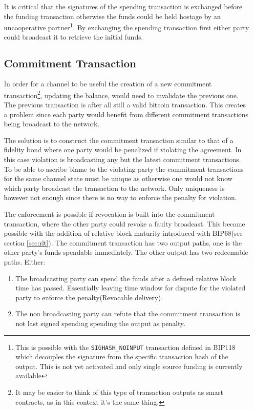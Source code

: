 It is critical that the signatures of the spending transaction is exchanged before the funding transaction otherwise the funds could be held hostage by an uncooperative partner\footnote{This is possible with the \texttt{SIGHASH\_NOINPUT} transaction defined in BIP118\cite{bip:0118:sighash:noinput} which decouples the signature from the specific transaction hash of the output. This is not yet activated and only single source funding is currently available}. By exchanging the spending transaction first either party could broadcast it to retrieve the initial funds.

\subsection{Commitment Transaction}

In order for a channel to be useful the creation of a new commitment transaction\footnote{It may be easier to think of this type of transaction outputs as smart contracts, as in this context it's the same thing.}, updating the balance, would need to invalidate the previous one. The previous transaction is after all still a valid bitcoin transaction. This creates a problem since each party would benefit from different commitment transactions being broadcast to the network.

The solution is to construct the commitment transaction similar to that of a fidelity bond where one party would be penalized if violating the agreement. In this case violation is broadcasting any but the latest commitment transactions. To be able to ascribe blame to the violating party the commitment transactions for the same channel state must be unique as otherwise one would not know which party broadcast the transaction to the network. Only uniqueness is however not enough since there is no way to enforce the penalty for violation.

The enforcement is possible if revocation is built into the commitment transaction, where the other party could revoke a faulty broadcast. This became possible with the addition of relative block maturity introduced with BIP68(see section \ref{sec:rlt}). The commitment transaction has two output paths, one is the other party's funds spendable immediately. The other output has two redeemable paths. Either:

\begin{enumerate}
	\item The broadcasting party can spend the funds after a defined relative block time has passed. Essentially leaving time window for dispute for the violated party to enforce the penalty(Revocable delivery).
	\item The non broadcasting party can refute that the commitment transaction is not last signed spending spending the output as penalty.
\end{enumerate}

